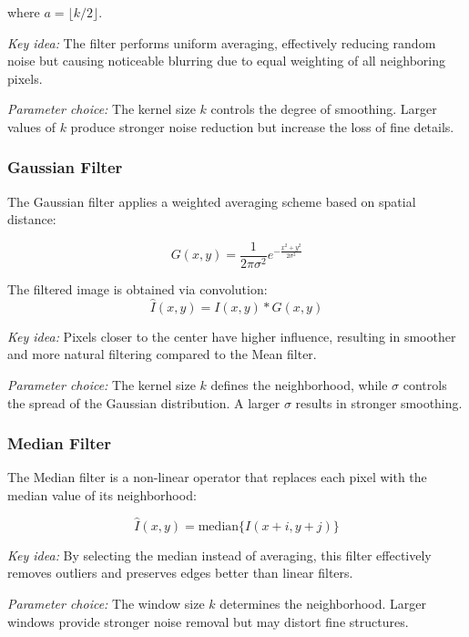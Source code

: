 \documentclass[a4paper,12pt]{article}
\begin{document}
where $a = \lfloor k/2 \rfloor$.

\textit{Key idea:} The filter performs uniform averaging, effectively reducing random noise but causing noticeable blurring due to equal weighting of all neighboring pixels.

\textit{Parameter choice:}  
The kernel size $k$ controls the degree of smoothing. Larger values of $k$ produce stronger noise reduction but increase the loss of fine details.

\subsubsection{Gaussian Filter}

The Gaussian filter applies a weighted averaging scheme based on spatial distance:

\begin{equation}
G(x,y) = \frac{1}{2\pi\sigma^2} e^{-\frac{x^2 + y^2}{2\sigma^2}}
\end{equation}

The filtered image is obtained via convolution:
\begin{equation}
\hat{I}(x,y) = I(x,y) * G(x,y)
\end{equation}

\textit{Key idea:} Pixels closer to the center have higher influence, resulting in smoother and more natural filtering compared to the Mean filter.

\textit{Parameter choice:}  
The kernel size $k$ defines the neighborhood, while $\sigma$ controls the spread of the Gaussian distribution. A larger $\sigma$ results in stronger smoothing.

\subsubsection{Median Filter}

The Median filter is a non-linear operator that replaces each pixel with the median value of its neighborhood:

\begin{equation}
\hat{I}(x,y) = \mathrm{median} \{ I(x+i, y+j) \}
\end{equation}

\textit{Key idea:} By selecting the median instead of averaging, this filter effectively removes outliers and preserves edges better than linear filters.

\textit{Parameter choice:}  
The window size $k$ determines the neighborhood. Larger windows provide stronger noise removal but may distort fine structures.
\end{document}
